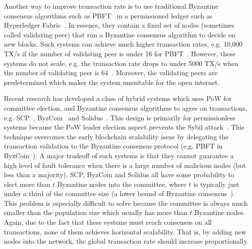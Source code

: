 Another way to improve transaction rate is to use traditional Byzantine consensus algorithms such as PBFT~\cite{castro1999practical} in a permissioned ledger such as Hyperledger Fabric~\cite{cachin2016architecture}.
In essence, they contain a fixed set of nodes (sometimes called validating peer) that run a Byzantine consensus algorithm to decide on new blocks.
Such systems can achieve much higher transaction rates, e.g. 10,000 TX/s if the number of validating peer is under 16 for PBFT~\cite[Section 5.2]{miller2016honey}.
However, these systems do not scale, e.g. the transaction rate drops to under 5000 TX/s when the number of validating peer is 64~\cite[Section 5.2]{miller2016honey}.
Moreover, the validating peers are predetermined which makes the system unsuitable for the open internet.

Recent research has developed a class of hybrid systems which uses PoW for committee election,
and Byzantine consensus algorithms to agree on transactions, e.g. SCP~\cite{luu2015scp}, ByzCoin~\cite{kogias2016enhancing} and Solidus~\cite{abraham2016solidus}.
This design is primarily for permissionless systems because the PoW leader election aspect prevents the Sybil attack~\cite{douceur2002sybil}.
This technique overcomes the early blockchain scalability issue by delegating the transaction validation to the Byzantine consensus protocol (e.g. PBFT in ByzCoin~\cite{kogias2016enhancing}).
A major tradeoff of such systems is that they cannot guarantee a high level of fault tolerance when there is a large number of malicious nodes (but less than a majority).
SCP, ByzCoin and Solidus all have some probability to elect more than $t$ Byzantine nodes into the committee,
where $t$ is typically just under a third of the committee size (a lower bound of Byzantine consensus~\cite{pease1980reaching}).
This problem is especially difficult to solve because the committee is always much smaller than the population size which usually has more than $t$ Byzantine nodes.
Again, due to the fact that these systems must reach consensus on all transactions,
none of them achieves horizontal scalability.
That is, by adding new nodes into the network, the global transaction rate should increase proportionally.

